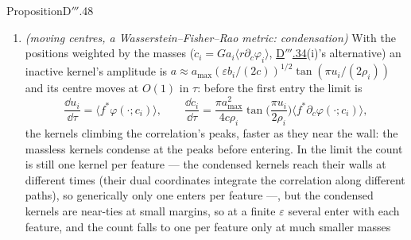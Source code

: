 \begin{thm}{Proposition}{D$'''$.48}
\begin{enumerate}[label=\textup{(\roman*)}]
    kernel enters once the block fits the target exactly. A tie shares a feature: a bump midway between two grid kernels
    is formed by both, at its centre, with half its amplitude each, at every $\varepsilon$. Generically (no ties), a
    target of $k$ separated bumps of the kernels' width is formed by $k$ kernels at the bumps' centres, the others
    keeping their starting positions and negligible masses --- in the limit $\varepsilon\to0$ at fixed margins. At a
    finite $\varepsilon$ the margins the entries leave decide (Proposition D$'''$.51): a runner-up whose margin at an
    entry is $O(\varepsilon^{1/2})$ is pulled across its wall by the entrant's overshoot and shares the feature, and a
    kernel lingering near its wall in an unfitted residual creeps into it unless $\varepsilon\ll\mu^4$; so near a tie (a
    bump 0.001 off the midpoint) the loop forms an extra kernel down to $\varepsilon\approx10^{-6}$, and close bumps'
    next kernel, creeping toward the residual's peak while it waits, enters earlier than on the path. A target that is
    not a few kernels of the dictionary's width (bumps wider than the kernels) is fitted along a staircase: the kernels
    enter one at a time at roughly geometrically growing times (the next entry waits $\propto1/\abs r$), the residual
    falling at each entry.
  \item \emph{(moving centres, a Wasserstein--Fisher--Rao metric: condensation)} With the positions weighted by the
    masses ($\dot c_i = Ga_i\langle r\partial_c\varphi_i\rangle$, \hyperref[res:thmDppp:34]{D$'''$.34}(i)'s alternative)
    an inactive kernel's amplitude is $a\approx a_{\max}(\varepsilon b_i/(2c))^{1/2}\tan(\pi u_i/(2\rho_i))$ and its
    centre moves at $O(1)$ in $\tau$: before the first entry the limit is
    \[
      \frac{\dd u_i}{\dd\tau} = \langle f^*\varphi(\cdot;c_i)\rangle,\qquad
      \frac{\dd c_i}{\dd\tau} = \frac{\pi a_{\max}^2}{4c\rho_i}\tan\Big(\frac{\pi u_i}{2\rho_i}\Big)
      \langle f^*\partial_c\varphi(\cdot;c_i)\rangle,
    \]
    the kernels climbing the correlation's peaks, faster as they near the wall: the massless kernels condense at the
    peaks before entering. In the limit the count is still one kernel per feature --- the condensed kernels reach their
    walls at different times (their dual coordinates integrate the correlation along different paths), so generically
    only one enters per feature ---, but the condensed kernels are near-ties at small margins, so at a finite
    $\varepsilon$ several enter with each feature, and the count falls to one per feature only at much smaller masses

\end{enumerate}
\end{thm}
